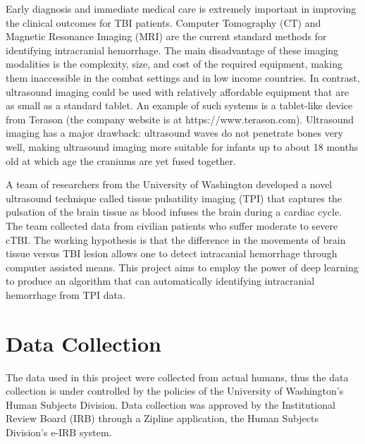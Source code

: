\documentclass [11pt, proquest] {uwthesis}[2020/02/24]
\begin{document}
Early diagnosis and immediate medical care is extremely important in improving the clinical outcomes for 
TBI patients\cite{management_2000}. Computer Tomography (CT) and Magnetic
Resonance Imaging (MRI) are the current standard methods for identifying  intracranial 
hemorrhage\cite{heit_imaging_2017}. The main disadvantage of these imaging modalities is the
complexity, size, and cost of the required equipment, making them inaccessible in the combat settings
and in low income countries. In contrast, ultrasound imaging could be used with relatively affordable
equipment that are as small as a standard tablet. An example of such systems is a tablet-like device 
from Terason (the company website is at https://www.terason.com). Ultrasound imaging has a major
drawback: ultrasound waves do not penetrate bones very well, making ultrasound imaging more suitable
for infants up to about 18 months old at which age the craniums are yet fused together\cite{cranial_ult}.

A team of researchers from the University of Washington  developed a novel ultrasound technique called
tissue pulsatility imaging (TPI) that captures the pulsation of the brain tissue as blood infuses the
brain during a cardiac cycle\cite{kucewicz_tissue_2008}. The team collected data from civilian patients who 
suffer moderate to severe cTBI. The working hypothesis is that the difference in the movements of brain tissue versus 
TBI lesion allows one to detect intracanial hemorrhage through computer assisted means. This project aims to employ the power
of deep learning to produce an algorithm that can automatically identifying intracranial hemorrhage from TPI data.

\section{Data Collection}
The data used in this project were collected from actual humans, thus the data collection is under controlled
by the policies of the University of Washington's Human Subjects Division. Data collection was approved by 
the Institutional Review Board (IRB) through a Zipline application, the Human Subjects Division's e-IRB system.
\end{document}
